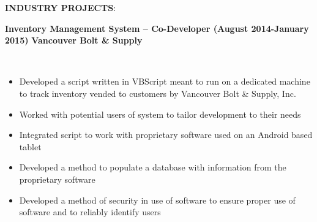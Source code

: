 \documentclass{article}
\begin{document}
\newpage
\noindent \textbf{INDUSTRY PROJECTS}: \\
\begin{vwcol}[widths={0.8,0.2}, sep=.8cm, justify=flush, rule=0pt, indent=0em]
\noindent \textbf{Inventory Management System – Co-Developer (August 2014-January 2015)}
\newpage
\noindent \textbf{Vancouver Bolt \& Supply}
\end{vwcol}
\phantom \\
\begin{itemize}
\item Developed a script written in VBScript meant to run on a dedicated machine to track inventory vended to customers by Vancouver Bolt \& Supply, Inc.
\item Worked with potential users of system to tailor development to their needs
\item Integrated script to work with proprietary software used on an Android based tablet
\item Developed a method to populate a database with information from the proprietary software
\item Developed a method of security in use of software to ensure proper use of software and to reliably identify users
\end{itemize}
\phantom \\
\phantom \\
%
%
%
%
\par
\phantom \\
\phantom \\
\end{document}
